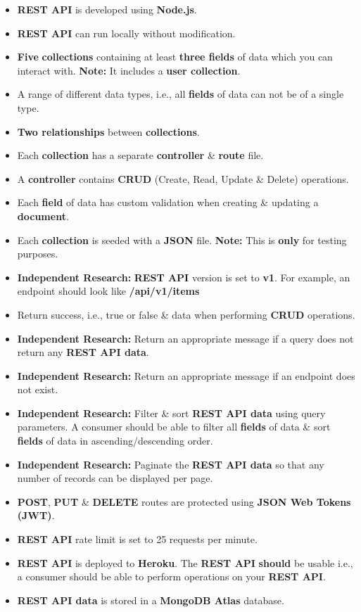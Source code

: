 \documentclass{article}
\begin{document}
\begin{itemize}
	\item \textbf{REST API} is developed using \textbf{Node.js}.
	\item \textbf{REST API} can run locally without modification.
	\item \textbf{Five} \textbf{collections} containing at least \textbf{three fields} of data which you can interact with. \textbf{Note:} It includes a \textbf{user collection}.
	\item A range of different data types, i.e., all \textbf{fields} of data can not be of a single type.
	\item \textbf{Two relationships} between \textbf{collections}.
	\item Each \textbf{collection} has a separate \textbf{controller} \& \textbf{route} file.
	\item A \textbf{controller} contains \textbf{CRUD} (Create, Read, Update \& Delete) operations.
	\item Each \textbf{field} of data has custom validation when creating \& updating a \textbf{document}.
	\item Each \textbf{collection} is seeded with a \textbf{JSON} file. \textbf{Note:} This is \textbf{only} for testing purposes.
	\item \textbf{Independent Research:} \textbf{REST API} version is set to \textbf{v1}. For example, an endpoint should look like \textbf{/api/v1/items}
	\item Return success, i.e., true or false \& data when performing \textbf{CRUD} operations.
	\item \textbf{Independent Research:} Return an appropriate message if a query does not return any \textbf{REST API data}.
	\item \textbf{Independent Research:} Return an appropriate message if an endpoint does not exist.
	\item \textbf{Independent Research:} Filter \& sort \textbf{REST API data} using query parameters. A consumer should be able to filter all \textbf{fields} of data \& sort \textbf{fields} of data in ascending/descending order.
	\item \textbf{Independent Research:} Paginate the \textbf{REST API data} so that any number of records can be displayed per page.
	\item \textbf{POST}, \textbf{PUT} \& \textbf{DELETE} routes are protected using \textbf{JSON Web Tokens (JWT)}.
	\item \textbf{REST API} rate limit is set to 25 requests per minute.
	\item \textbf{REST API} is deployed to \textbf{Heroku}. The \textbf{REST API} \textbf{should} be usable i.e., a consumer should be able to perform operations on your \textbf{REST API}.
	\item \textbf{REST API data} is stored in a \textbf{MongoDB Atlas} database.
\end{itemize}
\end{document}
